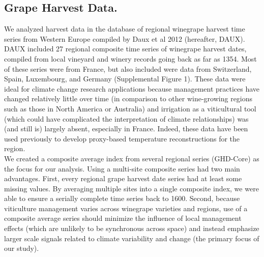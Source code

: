 \documentclass[final]{nature}
\begin{document}
\begin{methods}
\subsection{Grape Harvest Data.}
\noindent We analyzed harvest data in the database of regional winegrape harvest time series from Western Europe compiled by Daux et al 2012 (hereafter, DAUX\cite{Daux2012}). DAUX included 27 regional composite time series of winegrape harvest dates, compiled from local vineyard and winery records going back as far as 1354. Most of these series were from France, but also included were data from Switzerland, Spain, Luxembourg, and Germany (Supplemental Figure 1). These data were ideal for climate change research applications because management practices have changed relatively little over time (in comparison to other wine-growing regions such as those in North America or Australia) and irrigation as a viticultural tool (which could have complicated the interpretation of climate relationships) was (and still is) largely absent, especially in France. Indeed, these data have been used previously to develop proxy-based temperature reconstructions for the region\cite{Chuine2004,Daux2012}.\\
\indent We created a composite average index from several regional series (GHD-Core) as the focus for our analysis. Using a multi-site composite series had two main advantages. First, every regional grape harvest date series had at least some missing values. By averaging multiple sites into a single composite index, we were able to ensure a serially complete time series back to 1600. Second, because viticulture management varies across winegrape varieties and regions, use of a composite average series should minimize the influence of local management effects (which are unlikely to be synchronous across space) and instead emphasize larger scale signals related to climate variability and change (the primary focus of our study).\\

\end{methods}
\end{document}
